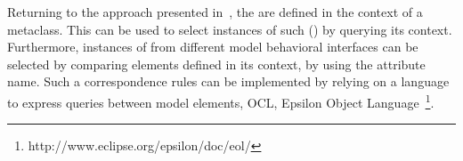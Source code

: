 Returning to the approach presented in~\cite{sle13-combemale}, the \dse are defined in the context of a metaclass. This can be used to select instances of such \dse (\mse) by querying its context. Furthermore, instances of \dse from different model behavioral interfaces can be selected by comparing elements defined in its context, \ie by using the attribute name. Such a correspondence rules can be implemented by relying on a language to express queries between model elements, \eg OCL, Epsilon Object Language~\footnote{http://www.eclipse.org/epsilon/doc/eol/}.      
			
			
						 
							
						
				
